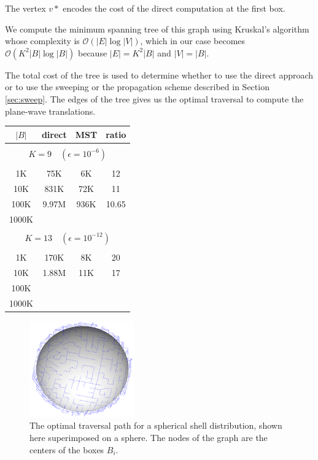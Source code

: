 The vertex $v*$ encodes the cost of the direct computation at the first box. 

We compute the minimum spanning tree of this graph using Kruskal's algorithm \cite{kruskal56} whose complexity is $\mathcal{O}(|E| \log |V|)$, which in our case becomes $\mathcal{O}(K^2 |B| \log |B|)$ because $|E| = K^2 |B|$ and $|V| = |B|$.
 

The total cost of the tree is used to determine whether to use the direct approach or to use the sweeping or the propagation scheme described in Section \ref{sec:sweep}. The edges of the tree gives us the optimal traversal to compute the plane-wave translations.
\begin{table}
\centering
\begin{tabular}{cccc} \hline
        $|B|$  &  direct & MST & ratio \\ \hline       
        \multicolumn{4}{c}{}  \\
        \multicolumn{4}{c}{ {\small $K =  9 \quad (\epsilon = 10^{-6})$}}  \\
        \multicolumn{4}{c}{}  \\
         1K & 75K & 6K & 12 \\  
        10K & 831K & 72K & 11 \\  
       100K & 9.97M & 936K & 10.65 \\  
       1000K & & &  \\  
       \multicolumn{4}{c}{}  \\
       \multicolumn{4}{c}{ {\small $K =  13 \quad (\epsilon = 10^{-12})$}}  \\
       \multicolumn{4}{c}{}  \\
             1K & 170K & 8K & 20 \\  
        10K & 1.88M & 11K & 17 \\  
        100K & & &  \\  
       1000K & & &  \\  
\hline
\end{tabular}
\end{table}


\begin{figure}
\centering 	
\includegraphics[width=0.4\textwidth]{figs/sphere_mst}
\caption{The optimal traversal path for a spherical shell distribution, shown here superimposed on a sphere. The nodes of the graph are the centers of the boxes $B_i$.}
\end{figure}

